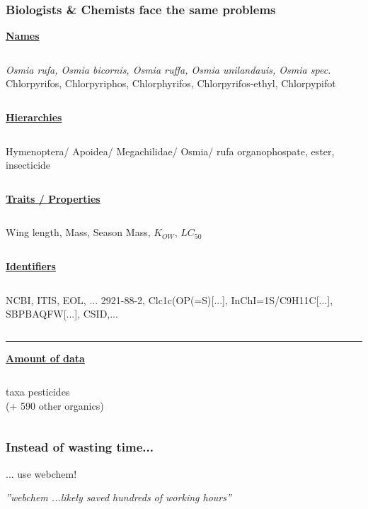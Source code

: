 \documentclass[10pt
	]{beamer}
\begin{document}
\begin{frame}
\frametitle{Biologists \& Chemists face the same problems}
	\small
	\centering
	\textbf{\alert{\underline{Names}}}
	\begin{columns}[t]
	\emph{Osmia rufa, Osmia bicornis, Osmia ruffa, Osmia unilandauis, Osmia spec.} 
	Chlorpyrifos, Chlorpyriphos, Chlorphyrifos, Chlorpyrifos-ethyl, Chlorpypifot
	\end{columns}
	\pause

	\centering
	\textbf{\alert{\underline{Hierarchies}}}
	\begin{columns}[t]
	Hymenoptera/ Apoidea/ Megachilidae/ Osmia/ rufa 
	organophospate, ester, insecticide
	\end{columns}
	\pause

	\centering
	\textbf{\alert{\underline{Traits / Properties}}}
	\begin{columns}[t]
	Wing length, Mass, Season 
	Mass, $K_{OW}$, $LC_{50}$
	\end{columns}
	\pause

	\centering
	\textbf{\alert{\underline{Identifiers}}}
	\begin{columns}[t]
	NCBI, ITIS, EOL, ... 
	2921-88-2, Clc1c(OP(=S)[...], InChI=1S/C9H11C[...], SBPBAQFW[...], CSID,...
	\end{columns}
	\vspace{0.8em}
	\pause

	\rule{\textwidth}{1pt}
	\textbf{\alert{\underline{Amount of data}}}

	\begin{columns}[t]
	 taxa
	 pesticides \\ (+ 590 other organics)
	\end{columns}
\end{frame}


{%
\begin{frame}{}
\frametitle{Instead of wasting time...}
... use \alert{webchem}! \\
	\hspace*{2cm}
	\begin{adjustbox}{max totalsize={\textwidth}{0.8\textheight}}
				
	\end{adjustbox}

\pause
\vspace*{-1cm}\emph{''\alert{webchem} ...likely saved hundreds of working hours''}
\end{frame}
}
\end{document}
